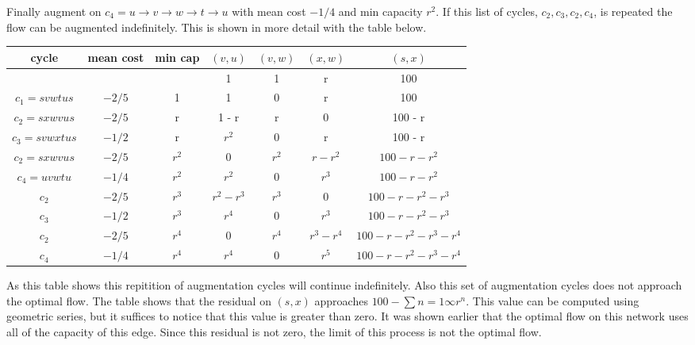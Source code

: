 \documentclass[11pt, oneside]{article}
\begin{document}
\begin{enumerate}
    Finally augment on $c_4 = u \to v \to w \to t \to u$ with mean cost $-1/4$
    and min capacity $r^2$.
    If this list of cycles, $c_2, c_3, c_2, c_4$, is repeated the flow can be
    augmented indefinitely.
    This is shown in more detail with the table below.
    \begin{center}
      \begin{tabular}{ccccccc}
        \toprule
        cycle & mean cost & min cap & $(v, u)$ & $(v, w)$ & $(x, w)$ & $(s, x)$ \\
        \midrule
                        &        &       &           1 &     1 &           r & 100 \\
        $c_1 = svwtus$  & $-2/5$ &     1 &           1 &     0 &           r & 100 \\
        $c_2 = sxwvus$  & $-2/5$ &     r &       1 - r &     r &           0 & 100 - r \\
        $c_3 = svwxtus$ & $-1/2$ &     r &       $r^2$ &     0 &           r & 100 - r \\
        $c_2 = sxwvus$  & $-2/5$ & $r^2$ &           0 & $r^2$ &   $r - r^2$ & $100 - r - r^2$ \\
        $c_4 = uvwtu$   & $-1/4$ & $r^2$ &       $r^2$ &     0 &       $r^3$ & $100 - r - r^2$ \\
        $c_2$           & $-2/5$ & $r^3$ & $r^2 - r^3$ & $r^3$ &           0 & $100 - r - r^2 - r^3$ \\
        $c_3$           & $-1/2$ & $r^3$ &       $r^4$ &     0 &       $r^3$ & $100 - r - r^2 - r^3$ \\
        $c_2$           & $-2/5$ & $r^4$ &           0 & $r^4$ & $r^3 - r^4$ & $100 - r - r^2 - r^3 - r^4$ \\
        $c_4$           & $-1/4$ & $r^4$ &       $r^4$ &     0 &       $r^5$ & $100 - r - r^2 - r^3 - r^4$ \\
        \bottomrule
      \end{tabular}
    \end{center}

    As this table shows this repitition of augmentation cycles will continue
    indefinitely.
    Also this set of augmentation cycles does not approach the optimal flow.
    The table shows that the residual on $(s, x)$ approaches $100 - \sum{n = 1}{\infty}{r^n}$.
    This value can be computed using geometric series, but it suffices to
    notice that this value is greater than zero.
    It was shown earlier that the optimal flow on this network uses all of the
    capacity of this edge.
    Since this residual is not zero, the limit of this process is not the
    optimal flow.


\end{enumerate}
\end{document}
